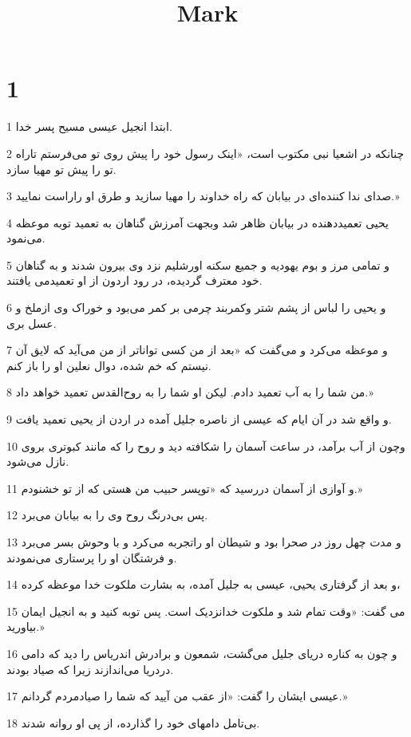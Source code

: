 

\title{Mark}


\chapter{1}

\par 1 ابتدا انجیل عیسی مسیح پسر خدا.
\par 2 چنانکه در اشعیا نبی مکتوب است، «اینک رسول خود را پیش روی تو می‌فرستم تاراه تو را پیش تو مهیا سازد.
\par 3 صدای ندا کننده‌ای در بیابان که راه خداوند را مهیا سازید و طرق او راراست نمایید.»
\par 4 یحیی تعمید‌دهنده در بیابان ظاهر شد وبجهت آمرزش گناهان به تعمید توبه موعظه می‌نمود.
\par 5 و تمامی مرز و بوم یهودیه و جمیع سکنه اورشلیم نزد وی بیرون شدند و به گناهان خود معترف گردیده، در رود اردون از او تعمیدمی یافتند.
\par 6 و یحیی را لباس از پشم شتر وکمربند چرمی بر کمر می‌بود و خوراک وی ازملخ و عسل بری.
\par 7 و موعظه می‌کرد و می‌گفت که «بعد از من کسی تواناتر از من می‌آید که لایق آن نیستم که خم شده، دوال نعلین او را باز کنم.
\par 8 من شما را به آب تعمید دادم. لیکن او شما را به روح‌القدس تعمید خواهد داد.»
\par 9 و واقع شد در آن ایام که عیسی از ناصره جلیل آمده در اردن از یحیی تعمید یافت.
\par 10 وچون از آب برآمد، در ساعت آسمان را شکافته دید و روح را که مانند کبوتری بروی نازل می‌شود.
\par 11 و آوازی از آسمان در‌رسید که «توپسر حبیب من هستی که از تو خشنودم.»
\par 12 پس بی‌درنگ روح وی را به بیابان می‌برد.
\par 13 و مدت چهل روز در صحرا بود و شیطان او راتجربه می‌کرد و با وحوش بسر می‌برد و فرشتگان او را پرستاری می‌نمودند.
\par 14 و بعد از گرفتاری یحیی، عیسی به جلیل آمده، به بشارت ملکوت خدا موعظه کرده،
\par 15 می گفت: «وقت تمام شد و ملکوت خدانزدیک است. پس توبه کنید و به انجیل ایمان بیاورید.»
\par 16 و چون به کناره دریای جلیل می‌گشت، شمعون و برادرش اندریاس را دید که دامی دردریا می‌اندازند زیرا که صیاد بودند.
\par 17 عیسی ایشان را گفت: «از عقب من آیید که شما را صیادمردم گردانم.»
\par 18 بی‌تامل دامهای خود را گذارده، از پی او روانه شدند.
